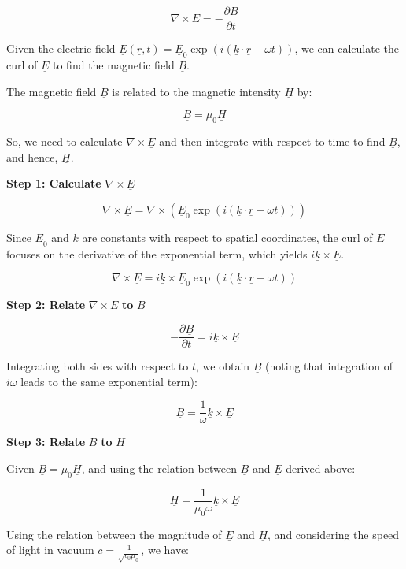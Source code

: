 \documentclass[a4paper,11pt]{article}
\begin{document}
\[
\nabla \times \underline{E} = - \frac{\partial \underline{B}}{\partial t}
\]

Given the electric field \(\underline{E}(\underline{r}, t) = \underline{E}_{0} \exp (i(\underline{k} \cdot \underline{r} - \omega t))\), we can calculate the curl of \(\underline{E}\) to find the magnetic field \(\underline{B}\).

The magnetic field \(\underline{B}\) is related to the magnetic intensity \(\underline{H}\) by:

\[
\underline{B} = \mu_{0} \underline{H}
\]

So, we need to calculate \(\nabla \times \underline{E}\) and then integrate with respect to time to find \(\underline{B}\), and hence, \(\underline{H}\).

\textbf{Step 1: Calculate} \(\nabla \times \underline{E}\)

\[
\nabla \times \underline{E} = \nabla \times (\underline{E}_{0} \exp(i(\underline{k} \cdot \underline{r} - \omega t)))
\]

Since \(\underline{E}_{0}\) and \(\underline{k}\) are constants with respect to spatial coordinates, the curl of \(\underline{E}\) focuses on the derivative of the exponential term, which yields \(i\underline{k} \times \underline{E}\).

\[
\nabla \times \underline{E} = i\underline{k} \times \underline{E}_{0} \exp(i(\underline{k} \cdot \underline{r} - \omega t))
\]

\textbf{Step 2: Relate} \(\nabla \times \underline{E}\) \textbf{to} \(\underline{B}\)

\[
- \frac{\partial \underline{B}}{\partial t} = i\underline{k} \times \underline{E}
\]

Integrating both sides with respect to \(t\), we obtain \(\underline{B}\) (noting that integration of \(i\omega\) leads to the same exponential term):

\[
\underline{B} = \frac{1}{\omega} \underline{k} \times \underline{E}
\]

\textbf{Step 3: Relate} \(\underline{B}\) \textbf{to} \(\underline{H}\)

Given \(\underline{B} = \mu_{0} \underline{H}\), and using the relation between \(\underline{B}\) and \(\underline{E}\) derived above:

\[
\underline{H} = \frac{1}{\mu_{0}\omega} \underline{k} \times \underline{E}
\]

Using the relation between the magnitude of \(\underline{E}\) and \(\underline{H}\), and considering the speed of light in vacuum \(c = \frac{1}{\sqrt{\epsilon_{0}\mu_{0}}}\), we have:
\end{document}
